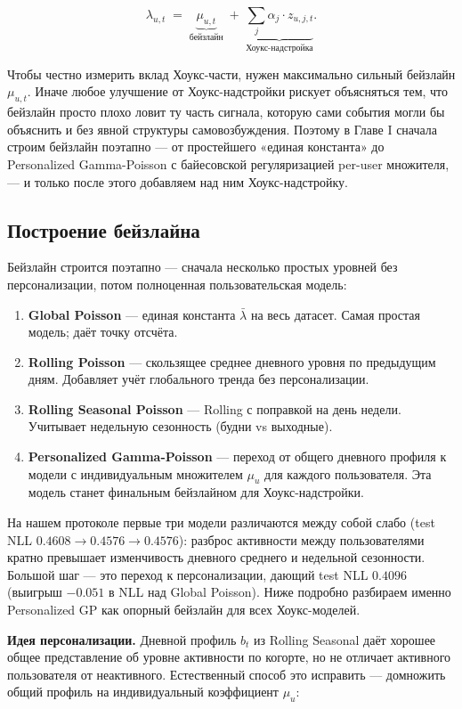 \documentclass[12pt,a4paper]{article}
\begin{document}
\[
\lambda_{u,t} \;=\; \underbrace{\mu_{u,t}}_{\text{бейзлайн}} \;+\; \underbrace{\sum_{j} \alpha_j \cdot z_{u,j,t}}_{\text{Хоукс-надстройка}}.
\]

Чтобы честно измерить вклад Хоукс-части, нужен максимально сильный бейзлайн $\mu _{u,t}$. Иначе любое улучшение от Хоукс-надстройки рискует объясняться тем, что бейзлайн просто плохо ловит ту часть сигнала, которую сами события могли бы объяснить и без явной структуры самовозбуждения. Поэтому в Главе I сначала строим бейзлайн поэтапно --- от простейшего «единая константа» до Personalized Gamma-Poisson с байесовской регуляризацией per-user множителя, --- и только после этого добавляем над ним Хоукс-надстройку.

\FloatBarrier
\subsection{Построение бейзлайна}

Бейзлайн строится поэтапно --- сначала несколько простых уровней без персонализации, потом полноценная пользовательская модель:

\begin{enumerate}
  \item \textbf{Global Poisson} --- единая константа $\bar{\lambda}$ на весь датасет. Самая простая модель; даёт точку отсчёта.
  \item \textbf{Rolling Poisson} --- скользящее среднее дневного уровня по предыдущим дням. Добавляет учёт глобального тренда без персонализации.
  \item \textbf{Rolling Seasonal Poisson} --- Rolling с поправкой на день недели. Учитывает недельную сезонность (будни vs выходные).
  \item \textbf{Personalized Gamma-Poisson} --- переход от общего дневного профиля к модели с индивидуальным множителем $\mu _u$ для каждого пользователя. Эта модель станет финальным бейзлайном для Хоукс-надстройки.
\end{enumerate}


На нашем протоколе первые три модели различаются между собой слабо (test NLL $0.4608  \to  0.4576  \to  0.4576$): разброс активности между пользователями кратно превышает изменчивость дневного среднего и недельной сезонности. Большой шаг --- это переход к персонализации, дающий test NLL $0.4096$ (выигрыш $-0.051$ в NLL над Global Poisson). Ниже подробно разбираем именно Personalized GP как опорный бейзлайн для всех Хоукс-моделей.

\textbf{Идея персонализации.} Дневной профиль $b_t$ из Rolling Seasonal даёт хорошее общее представление об уровне активности по когорте, но не отличает активного пользователя от неактивного. Естественный способ это исправить --- домножить общий профиль на индивидуальный коэффициент $\mu _u$:
\end{document}
